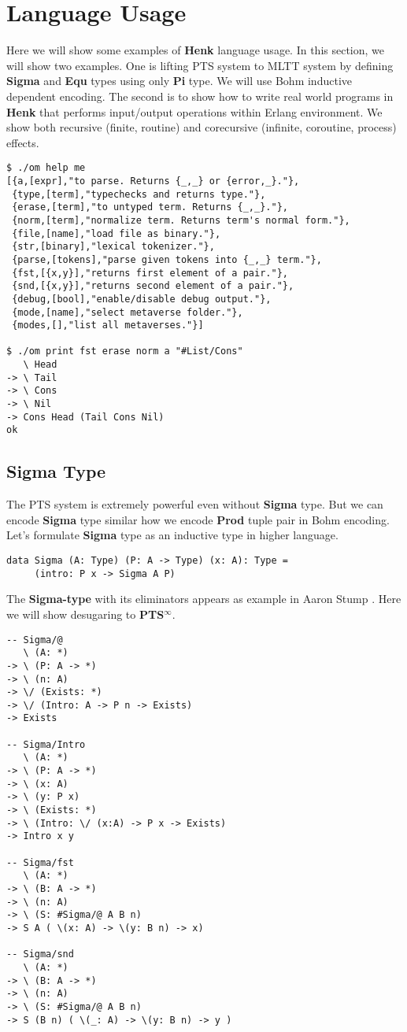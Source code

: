 \documentclass{article}
\begin{document}
\section{Language Usage}
Here we will show some examples of {\bf Henk} language usage.
In this section, we will show two examples.
One is lifting PTS system to MLTT system by defining {\bf Sigma} and {\bf Equ} types using only {\bf Pi} type.
We will use Bohm inductive dependent encoding\cite{Bohm85}.
The second is to show how to write real world programs in {\bf Henk} that performs input/output operations within Erlang environment.
We show both recursive (finite, routine) and corecursive (infinite, coroutine, process) effects.

\begin{lstlisting}
$ ./om help me
[{a,[expr],"to parse. Returns {_,_} or {error,_}."},
 {type,[term],"typechecks and returns type."},
 {erase,[term],"to untyped term. Returns {_,_}."},
 {norm,[term],"normalize term. Returns term's normal form."},
 {file,[name],"load file as binary."},
 {str,[binary],"lexical tokenizer."},
 {parse,[tokens],"parse given tokens into {_,_} term."},
 {fst,[{x,y}],"returns first element of a pair."},
 {snd,[{x,y}],"returns second element of a pair."},
 {debug,[bool],"enable/disable debug output."},
 {mode,[name],"select metaverse folder."},
 {modes,[],"list all metaverses."}]

$ ./om print fst erase norm a "#List/Cons"
   \ Head
-> \ Tail
-> \ Cons
-> \ Nil
-> Cons Head (Tail Cons Nil)
ok
\end{lstlisting}


\subsection{Sigma Type}
The PTS system is extremely powerful even without {\bf Sigma} type.
But we can encode {\bf Sigma} type similar how we encode {\bf Prod} tuple pair in Bohm encoding.
Let's formulate {\bf Sigma} type as an inductive type in higher language.

\begin{lstlisting}
data Sigma (A: Type) (P: A -> Type) (x: A): Type =
     (intro: P x -> Sigma A P)
\end{lstlisting}

The {\bf Sigma-type} with its eliminators appears as example in Aaron Stump \cite{Stump17}.
Here we will show desugaring to {\bf PTS$^\infty$}.

\begin{lstlisting}
-- Sigma/@
   \ (A: *)
-> \ (P: A -> *)
-> \ (n: A)
-> \/ (Exists: *)
-> \/ (Intro: A -> P n -> Exists)
-> Exists

-- Sigma/Intro
   \ (A: *)
-> \ (P: A -> *)
-> \ (x: A)
-> \ (y: P x)
-> \ (Exists: *)
-> \ (Intro: \/ (x:A) -> P x -> Exists)
-> Intro x y

-- Sigma/fst
   \ (A: *)
-> \ (B: A -> *)
-> \ (n: A)
-> \ (S: #Sigma/@ A B n)
-> S A ( \(x: A) -> \(y: B n) -> x)

-- Sigma/snd
   \ (A: *)
-> \ (B: A -> *)
-> \ (n: A)
-> \ (S: #Sigma/@ A B n)
-> S (B n) ( \(_: A) -> \(y: B n) -> y )
\end{lstlisting}
\end{document}

